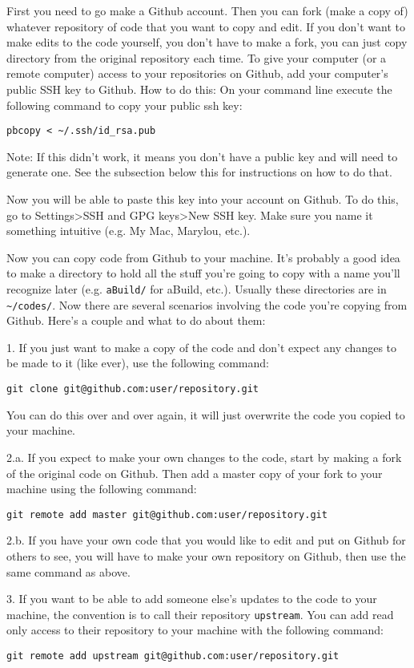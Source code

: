 \documentclass{article}
\begin{document}
First you need to go make a Github account. Then you can fork (make a
copy of) whatever repository of code that you want to copy and
edit. If you don't want to make edits to the code yourself, you don't
have to make a fork, you can just copy directory from the original
repository each time.
To give your computer (or a remote computer) access to your repositories
on Github, add your computer's public SSH key to Github. How to do
this:
On your command line execute the following command to copy
your public ssh key:
\begin{verbatim}
pbcopy < ~/.ssh/id_rsa.pub
\end{verbatim}
Note: If this didn't work, it means you don't have a public key and will
need to generate one. See the subsection below this for instructions
on how to do that. 

Now you will be able to paste this key into your account on Github. To
do this, go to Settings>SSH and GPG keys>New SSH key. Make sure you
name it something intuitive (e.g. My Mac, Marylou, etc.).

Now you can copy code from Github to your machine. It's
probably a good idea to make a directory to hold all the stuff you're
going to copy with a name you'll recognize later (e.g. \verb|aBuild/|
for aBuild, etc.). Usually these directories are in
\verb|~/codes/|. Now there are several scenarios involving the code
you're copying from Github. Here's a couple and what to do about them:

1. If you just want to make a copy of the code and don't
expect any changes to be made to it (like ever), use the following command:
\begin{verbatim}
git clone git@github.com:user/repository.git
\end{verbatim}
You can do this over and over again, it will just overwrite the code
you copied to your machine. 

2.a. If you expect to make your own changes to the code, start by making
a fork of the original code on Github. Then add a master copy of your
fork to your machine using the following command:
\begin{verbatim}
git remote add master git@github.com:user/repository.git
\end{verbatim}
2.b. If you have your own code that you would like to edit and put on
Github for others to see, you will have to make your own repository on
Github, then use the same command as above.

3. If you want to be able to add someone else's updates to the code to
your machine, the convention is to call their repository
\verb|upstream|. You can add read only access to their repository to
your machine with the following command:
\begin{verbatim}
git remote add upstream git@github.com:user/repository.git
\end{verbatim}
\end{document}
